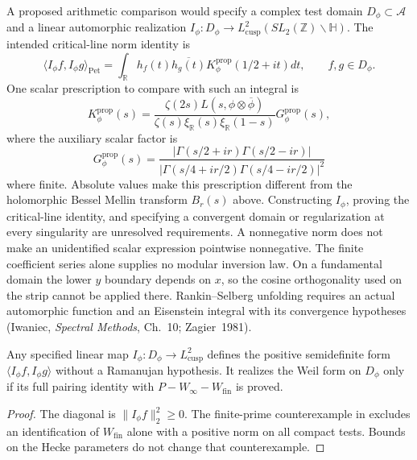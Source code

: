 \begin{remark}
A proposed arithmetic comparison would specify a complex test domain
$D_\phi\subset\mathscr A$ and a linear automorphic realization
$I_\phi:D_\phi\to L^2_{\mathrm{cusp}}(SL_2(\mathbb Z)\backslash\mathbb H)$.
The intended critical-line norm identity is
\begin{equation}
\label{v4-arith:w6-b:eq:maass-RS}
 \langle I_\phi f,I_\phi g\rangle_{\mathrm{Pet}}
 =\int_{\mathbb R}h_f(t)\overline{h_g(t)}
                K_\phi^{\mathrm{prop}}(1/2+it)dt,
 \qquad f,g\in D_\phi.
\end{equation}
One scalar prescription to compare with such an integral is
\begin{equation}
\label{v4-arith:w6-b:eq:Kphi}
 K_\phi^{\mathrm{prop}}(s)=
 \frac{\zeta(2s)L(s,\phi\otimes\overline\phi)}
 {\zeta(s)\xi_{\mathbb R}(s)\xi_{\mathbb R}(1-s)}G_\phi^{\mathrm{prop}}(s),
\end{equation}
where the auxiliary scalar factor is
\[
 G_\phi^{\mathrm{prop}}(s)=
 \frac{|\Gamma(s/2+ir)\Gamma(s/2-ir)|}
 {|\Gamma(s/4+ir/2)\Gamma(s/4-ir/2)|^2}
\]
where finite. Absolute values make this prescription different from
the holomorphic Bessel Mellin transform $B_r(s)$ above.
Constructing $I_\phi$, proving the critical-line identity, and
specifying a convergent domain or regularization at every singularity
are unresolved requirements. A nonnegative norm does not make an
unidentified scalar expression pointwise nonnegative.
The finite coefficient series alone supplies no modular inversion law.
On a fundamental domain the lower $y$ boundary depends on $x$,
so the cosine orthogonality used on the strip cannot be applied there.
Rankin--Selberg unfolding requires an actual automorphic function and
an Eisenstein integral with its convergence hypotheses
(Iwaniec, \emph{Spectral Methods}, Ch.~10; Zagier~1981).
\end{remark}

\begin{corollary}
\label{v4-arith:w6-b:cor:maass-closure}
Any specified linear map $I_\phi:D_\phi\to L^2_{\mathrm{cusp}}$
defines the positive semidefinite form
$\langle I_\phi f,I_\phi g\rangle$ without a Ramanujan hypothesis.
It realizes the Weil form on $D_\phi$ only if its full pairing
identity with $P-W_\infty-W_{\mathrm{fin}}$ is proved.
\end{corollary}
\begin{proof}
The diagonal is $\|I_\phi f\|_2^2\ge0$.
The finite-prime counterexample in
 excludes an identification of
$W_{\mathrm{fin}}$ alone with a positive norm on all compact tests.
Bounds on the Hecke parameters do not change that counterexample.
\end{proof}

